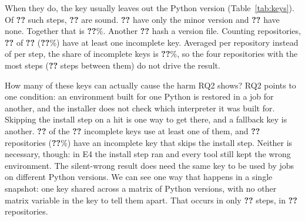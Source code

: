 \documentclass[10pt,a4paper]{article}
\newcommand{\ck}[1]{\textbf{??}}\newcommand{\repourl}{\url{https://github.com/mark124/cache-key-soundness}}%
\begin{document}
When they do, the key usually leaves out the Python version
(Table~\ref{tab:keys}). Of \ck{h.built_env_steps} such steps,
\ck{h.sound_steps} are sound. \ck{h.minor_only_steps} have only the minor
version and \ck{h.no_interpreter_steps} have none. Together that is
\ck{h.unsound_pct_of_built}\%. Another \ck{h.version_file_steps} hash a
version file. Counting repositories, \ck{h.repos_any_unsound} of
\ck{h.repos_caching_built_env}
(\ck{h.repos_any_unsound_pct_of_built_env_repos}\%) have at least one
incomplete key. Averaged per repository instead of per step, the share of
incomplete keys is \ck{h.repo_weighted_incomplete_pct}\%, so the four
repositories with the most steps (\ck{h.top4_repos_steps} steps between them)
do not drive the result.

How many of these keys can actually cause the harm RQ2 shows? RQ2 points to
one condition: an environment built for one Python is restored in a job for
another, and the installer does not check which interpreter it was built for.
Skipping the install step on a hit is one way to get there, and a fallback key
is another. \ck{h.unsound_with_skip_or_restore_keys} of the
\ck{h.unsound_steps} incomplete keys use at least one of them, and
\ck{h.repos_exposed} repositories (\ck{h.repos_exposed_pct_of_built_env_repos}\%)
have an incomplete key that skips the install step. Neither is necessary,
though: in E4 the install step ran and every tool still kept the wrong
environment. The silent-wrong result does need the same key to be used by
jobs on different Python versions. We
can see one way that happens in a single snapshot: one key shared across a
matrix of Python versions, with no other matrix variable in the key to tell
them apart. That occurs in only \ck{h.shared_across_python_steps} steps, in
\ck{h.shared_across_python_repos} repositories.
\end{document}
